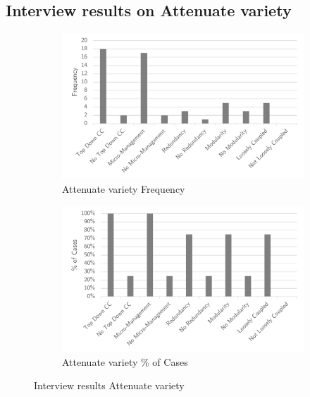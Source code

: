 \subsection{Interview results on Attenuate variety}
\label{sub:interviewresultsattenuate}
\begin{figure}[H]
	\centering
	\begin{subfigure}[H]{0.5\textwidth}
		\centering
		\includegraphics[width=0.95\linewidth]{images/attenuate_frequency}
		\caption{Attenuate variety Frequency}
		\label{fig:attenuatefrequency}
	\end{subfigure}%
	\begin{subfigure}[H]{0.5\textwidth}
		\centering
		\includegraphics[width=0.95\linewidth]{images/attenuate_cases}
		\caption{Attenuate variety \% of Cases}
		\label{fig:attenuatecases}
	\end{subfigure}
	\caption{Interview results Attenuate variety}
	\label{fig:interviewattenuatevariety}
\end{figure}
